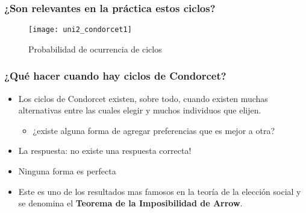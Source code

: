 \documentclass[14pt,aspectratio=169]{beamer}
\begin{document}
\begin{frame}\frametitle{¿Son relevantes en la práctica estos ciclos?}
  \begin{figure}[htbp]
    \centering
    \texttt{[image: uni2\_condorcet1]}
    \caption{Probabilidad de ocurrencia de ciclos}
    \label{fig:1}
  \end{figure}
\end{frame}

\begin{frame}\frametitle{¿Qué hacer cuando hay ciclos de Condorcet?}
\begin{itemize}
\item Los ciclos de Condorcet existen, sobre todo, cuando existen
  muchas alternativas entre las cuales elegir y muchos individuos que
  elijen.
\begin{itemize}\itemsep 5pt \medskip
\item ¿existe alguna forma de agregar preferencias que es mejor a otra?
\end{itemize}
\item La respuesta: no existe una respuesta correcta!
\item Ninguna forma es perfecta
\item Este es uno de los resultados mas famosos en la teoría de la
  elección social y se denomina el \textbf{Teorema de la Imposibilidad
    de Arrow}.
\end{itemize}
\end{frame}


\end{document}
